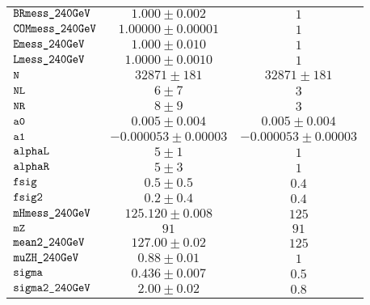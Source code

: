 \begin{tabular}{lcc}
$\verb+BRmess_240GeV+ $ & $  1.000\pm 0.002$ & $ 1$\\
$\verb+COMmess_240GeV+ $ & $  1.00000\pm 0.00001$ & $ 1$\\
$\verb+Emess_240GeV+ $ & $  1.000\pm 0.010$ & $ 1$\\
$\verb+Lmess_240GeV+ $ & $  1.0000\pm 0.0010$ & $ 1$\\
$\verb+N+ $ & $  32871\pm 181$ & $ 32871\pm 181$\\
$\verb+NL+ $ & $  6\pm 7$ & $ 3$\\
$\verb+NR+ $ & $  8\pm 9$ & $ 3$\\
$\verb+a0+ $ & $  0.005\pm 0.004$ & $ 0.005\pm 0.004$\\
$\verb+a1+ $ & $ -0.000053\pm 0.00003$ & $-0.000053\pm 0.00003$\\
$\verb+alphaL+ $ & $  5\pm 1$ & $ 1$\\
$\verb+alphaR+ $ & $  5\pm 3$ & $ 1$\\
$\verb+fsig+ $ & $  0.5\pm 0.5$ & $ 0.4$\\
$\verb+fsig2+ $ & $  0.2\pm 0.4$ & $ 0.4$\\
$\verb+mHmess_240GeV+ $ & $  125.120\pm 0.008$ & $ 125$\\
$\verb+mZ+ $ & $  91$ & $ 91$\\
$\verb+mean2_240GeV+ $ & $  127.00\pm 0.02$ & $ 125$\\
$\verb+muZH_240GeV+ $ & $  0.88\pm 0.01$ & $ 1$\\
$\verb+sigma+ $ & $  0.436\pm 0.007$ & $ 0.5$\\
$\verb+sigma2_240GeV+ $ & $  2.00\pm 0.02$ & $ 0.8$\\
\end{tabular}
